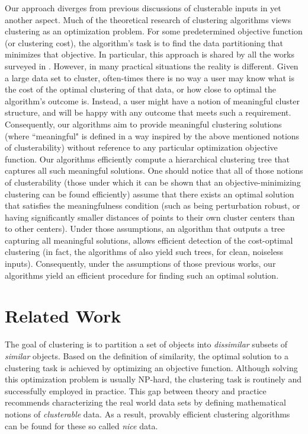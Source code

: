 \documentclass[12pt]{article}
\begin{document}
Our approach diverges from previous discussions of clusterable inputs in yet another aspect. Much of the theoretical research of clustering algorithms views clustering as an optimization problem. For some predetermined objective function (or clustering cost), the algorithm's task is to find the data partitioning that minimizes that objective. In particular, this approach is shared by all the works surveyed in \cite{ben2015computational}. However, in many practical situations the reality is different. Given a large data set to cluster, often-times there is no way a user may know what is the cost of the optimal clustering of that data, or how close to optimal the algorithm's outcome is. Instead, a user might have a notion of meaningful cluster structure, and will be happy with any outcome that meets such a requirement. Consequently, our algorithms aim to provide meaningful clustering solutions (where ``meaningful" is defined in a way inspired by the above mentioned notions of clusterability) without reference to any particular optimization objective function. Our algorithms efficiently compute a hierarchical clustering tree that captures all such meaningful solutions. One should notice that all of those notions of clusterability (those under which it can be shown that an objective-minimizing clustering can be found efficiently) assume that there exists an optimal solution that satisfies the meaningfulness condition (such as being perturbation robust, or having significantly smaller distances of points to their own cluster centers than to other centers). Under those assumptions, an algorithm that outputs a tree capturing all meaningful solutions, allows efficient detection of the cost-optimal clustering (in fact, the algorithms of \cite{balcan2012clustering} also yield such trees, for clean, noiseless inputs). Consequently, under the assumptions of those previous works, our algorithms yield an efficient procedure for finding such an optimal solution.

\section{Related Work}
The goal of clustering is to partition a set of objects into {\em dissimilar} subsets of {\em similar} objects. Based on the definition of similarity, the optimal solution to a clustering task is achieved by optimizing an objective function. Although solving this optimization problem is usually NP-hard, the clustering task is routinely and successfully employed in practice. This gap between theory and practice recommends characterizing the real world data sets by defining mathematical notions of {\em clusterable} data. As a result, provably efficient clustering algorithms can be found for these so called {\em nice} data.  
\end{document}
